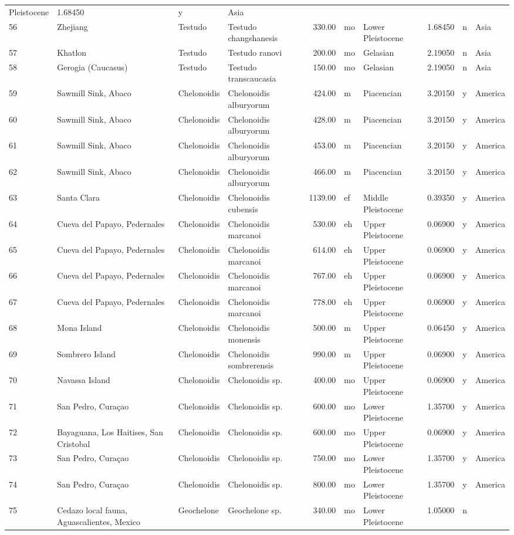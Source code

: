 \documentclass[]{article}
\begin{document}
\begin{longtable}[]{@{}llllrllrll@{}}
Pleistocene & 1.68450 & y & Asia\tabularnewline
56 & Zhejiang & Testudo & Testudo changshanesis & 330.00 & mo & Lower
Pleistocene & 1.68450 & n & Asia\tabularnewline
57 & Khatlon & Testudo & Testudo ranovi & 200.00 & mo & Gelasian &
2.19050 & n & Asia\tabularnewline
58 & Gerogia (Caucasus) & Testudo & Testudo transcaucasia & 150.00 & mo
& Gelasian & 2.19050 & n & Asia\tabularnewline
59 & Sawmill Sink, Abaco & Chelonoidis & Chelonoidis alburyorum & 424.00
& m & Piacencian & 3.20150 & y & America\tabularnewline
60 & Sawmill Sink, Abaco & Chelonoidis & Chelonoidis alburyorum & 428.00
& m & Piacencian & 3.20150 & y & America\tabularnewline
61 & Sawmill Sink, Abaco & Chelonoidis & Chelonoidis alburyorum & 453.00
& m & Piacencian & 3.20150 & y & America\tabularnewline
62 & Sawmill Sink, Abaco & Chelonoidis & Chelonoidis alburyorum & 466.00
& m & Piacencian & 3.20150 & y & America\tabularnewline
63 & Santa Clara & Chelonoidis & Chelonoidis cubensis & 1139.00 & ef &
Middle Pleistocene & 0.39350 & y & America\tabularnewline
64 & Cueva del Papayo, Pedernales & Chelonoidis & Chelonoidis marcanoi &
530.00 & eh & Upper Pleistocene & 0.06900 & y & America\tabularnewline
65 & Cueva del Papayo, Pedernales & Chelonoidis & Chelonoidis marcanoi &
614.00 & eh & Upper Pleistocene & 0.06900 & y & America\tabularnewline
66 & Cueva del Papayo, Pedernales & Chelonoidis & Chelonoidis marcanoi &
767.00 & eh & Upper Pleistocene & 0.06900 & y & America\tabularnewline
67 & Cueva del Papayo, Pedernales & Chelonoidis & Chelonoidis marcanoi &
778.00 & eh & Upper Pleistocene & 0.06900 & y & America\tabularnewline
68 & Mona Island & Chelonoidis & Chelonoidis monensis & 500.00 & m &
Upper Pleistocene & 0.06450 & y & America\tabularnewline
69 & Sombrero Island & Chelonoidis & Chelonoidis sombrerensis & 990.00 &
m & Upper Pleistocene & 0.06900 & y & America\tabularnewline
70 & Navassa Island & Chelonoidis & Chelonoidis sp. & 400.00 & mo &
Upper Pleistocene & 0.06900 & y & America\tabularnewline
71 & San Pedro, Curaçao & Chelonoidis & Chelonoidis sp. & 600.00 & mo &
Lower Pleistocene & 1.35700 & y & America\tabularnewline
72 & Bayaguana, Los Haitises, San Cristobal & Chelonoidis & Chelonoidis
sp. & 600.00 & mo & Upper Pleistocene & 0.06900 & y &
America\tabularnewline
73 & San Pedro, Curaçao & Chelonoidis & Chelonoidis sp. & 750.00 & mo &
Lower Pleistocene & 1.35700 & y & America\tabularnewline
74 & San Pedro, Curaçao & Chelonoidis & Chelonoidis sp. & 800.00 & mo &
Lower Pleistocene & 1.35700 & y & America\tabularnewline
75 & Cedazo local fauna, Aguascalientes, Mexico & Geochelone &
Geochelone sp. & 340.00 & mo & Lower Pleistocene & 1.05000 & n &

\end{longtable}
\end{document}
